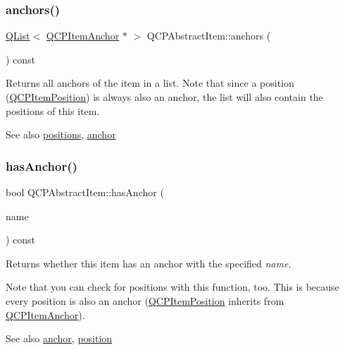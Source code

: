 \subsubsection{\texorpdfstring{anchors()}{anchors()}}
{\footnotesize\ttfamily \hyperlink{class_q_list}{Q\+List}$<$ \hyperlink{class_q_c_p_item_anchor}{Q\+C\+P\+Item\+Anchor} $\ast$ $>$ Q\+C\+P\+Abstract\+Item\+::anchors (\begin{DoxyParamCaption}{ }\end{DoxyParamCaption}) const\hspace{0.3cm}{\ttfamily [inline]}}

Returns all anchors of the item in a list. Note that since a position (\hyperlink{class_q_c_p_item_position}{Q\+C\+P\+Item\+Position}) is always also an anchor, the list will also contain the positions of this item.

\begin{DoxySeeAlso}{See also}
\hyperlink{class_q_c_p_abstract_item_a709f655ac3f7f22d452714134662b454}{positions}, \hyperlink{class_q_c_p_abstract_item_a139c255ea8831642fac91748e29a5adb}{anchor} 
\end{DoxySeeAlso}
\mbox{\label{class_q_c_p_abstract_item_a84914f4516f9b38ef0bd89eafe3dbda7}} 
\subsubsection{\texorpdfstring{has\+Anchor()}{hasAnchor()}}
{\footnotesize\ttfamily bool Q\+C\+P\+Abstract\+Item\+::has\+Anchor (\begin{DoxyParamCaption}\item[{const Q\+String \&}]{name }\end{DoxyParamCaption}) const}

Returns whether this item has an anchor with the specified {\itshape name}.

Note that you can check for positions with this function, too. This is because every position is also an anchor (\hyperlink{class_q_c_p_item_position}{Q\+C\+P\+Item\+Position} inherits from \hyperlink{class_q_c_p_item_anchor}{Q\+C\+P\+Item\+Anchor}).

\begin{DoxySeeAlso}{See also}
\hyperlink{class_q_c_p_abstract_item_a139c255ea8831642fac91748e29a5adb}{anchor}, \hyperlink{class_q_c_p_abstract_item_a2589c3d298f9a576d77d9addb440a18d}{position} 
\end{DoxySeeAlso}
\mbox{\label{class_q_c_p_abstract_item_a2589c3d298f9a576d77d9addb440a18d}} 
